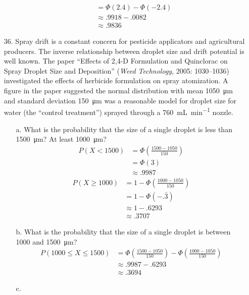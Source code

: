 \documentclass[letterpaper,12pt]{article}
\begin{document}
\begin{enumerate}
\begin{enumerate}
\begin{align*}
          &= \Phi(2.4) - \Phi(-2.4) \\
          &\approx .9918 - .0082 \\
          &\approx .9836
        \end{align*}
    \end{enumerate}
  \item[36.]
    Spray drift is a constant concern for pesticide applicators and agricultural producers. The inverse relationship between droplet size and drift potential is well known. The paper ``Effects of 2,4-D Formulation and Quinclorac on Spray Droplet Size and Deposition'' (\textit{Weed Technology}, 2005: 1030–1036) investigated the effects of herbicide formulation on spray atomization. A figure in the paper suggested the normal distribution with mean \qty{1050}{\micro\meter} and standard deviation \qty{150}{\micro\meter} was a reasonable model for droplet size for water (the ``control treatment'') sprayed through a \qty{760}{\milli\liter\per\minute} nozzle.
    \begin{enumerate}
      \item[a.]
        What is the probability that the size of a single droplet is less than \qty{1500}{\micro\meter}? At least \qty{1000}{\micro\meter}?
        \begin{align*}
          P(X < 1500) &= \Phi\left(\frac{1500 - 1050}{150}\right) \\
          &= \Phi(3) \\
          &\approx .9987
        \end{align*}
        \begin{align*}
          P(X \ge 1000) &= 1 - \Phi\left(\frac{1000 - 1050}{150}\right) \\
          &= 1 - \Phi(-.\bar{3}) \\
          &\approx 1 - .6293 \\
          &\approx .3707
        \end{align*}
      \item[b.]
        What is the probability that the size of a single droplet is between 1000 and \qty{1500}{\micro\meter}?
        \begin{align*}
          P(1000 \le X \le 1500) &= \Phi\left(\frac{1500 - 1050}{150}\right) - \Phi\left(\frac{1000 - 1050}{150}\right) \\
          &\approx .9987 - .6293 \\
          &\approx .3694
        \end{align*}
      \item[c.]

\end{enumerate}
\end{enumerate}
\end{document}
